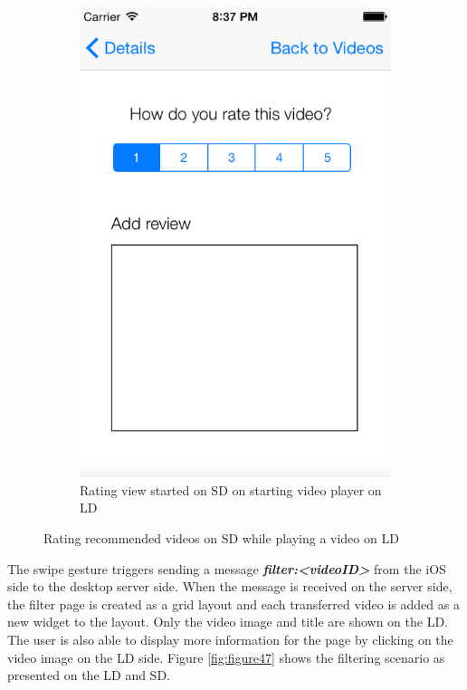 \begin{figure}
\begin{subfigure}[b]{0.3\textwidth}
        \includegraphics[width=\textwidth]{figures/ratingSD}
        \caption{Rating view started on SD on starting video player on LD}
        \label{fig:figure46b}
    \end{subfigure}
   \caption{Rating recommended videos on SD while playing a video on LD}\label{fig:figure46}
\end{figure}       
The swipe gesture triggers sending a message \textbf{\textit{filter:<videoID>}} from the iOS side to the desktop server side. 
When the message is received on the server side, the filter page is created as a
grid layout and each transferred video is added as a new widget to the layout.
Only the video image and title are shown on the LD. The user is also able to display more information for the page by clicking on the video image on the LD side. Figure \ref{fig:figure47} shows the filtering scenario as presented on the LD and SD.\par

